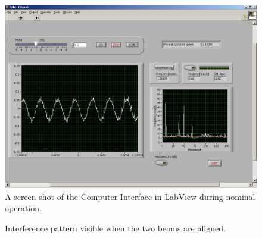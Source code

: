 \begin{figure}[h!]
    \centering
    \includegraphics[width=\textwidth]{Gyroscope/Report/pictures/donatlinus.jpg}
    \caption{A screen shot of the Computer Interface in LabView during nominal operation.}
    \label{fig:screenshot}
\end{figure}

        
\begin{figure}[h!]
    \centering
    \caption{Interference pattern visible when the two beams are aligned.}
    \label{fig:interference}
\end{figure}